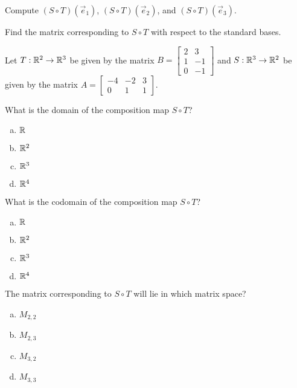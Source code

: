 \begin{applicationActivities}{1}{21}
\begin{activity}{0}
Compute $(S \circ T)(\vec{e}_1)$, $(S \circ T)(\vec{e}_2)$, and
$(S \circ T)(\vec{e}_3)$.
\end{activity}

\begin{activity}{0}
Find the matrix corresponding to $S \circ T$ with respect to the standard bases.
\end{activity}

\begin{activity}{0}
Let $T: \mathbb{R}^2 \rightarrow \mathbb{R}^3$ be given by the matrix $B=\begin{bmatrix} 2 & 3 \\ 1 & -1 \\ 0 & -1 \end{bmatrix}$ and $S: \mathbb{R}^3 \rightarrow \mathbb{R}^2$ be given by the matrix $A=\begin{bmatrix} -4 & -2 & 3 \\ 0 & 1 & 1 \end{bmatrix}$.

What is the domain of the composition map $S \circ T$?
\begin{enumerate}[(a)]
\item $\mathbb{R}$
\item $\mathbb{R}^2$
\item $\mathbb{R}^3$
\item $\mathbb{R}^4$
\end{enumerate}
\end{activity}

\begin{activity}{0}
What is the codomain of the composition map $S \circ T$?
\begin{enumerate}[(a)]
\item $\mathbb{R}$
\item $\mathbb{R}^2$
\item $\mathbb{R}^3$
\item $\mathbb{R}^4$
\end{enumerate}
\end{activity}

\begin{activity}{0}
The matrix corresponding to $S \circ T$ will lie in which matrix space?
\begin{enumerate}[(a)]
\item $M_{2,2}$
\item $M_{2,3}$
\item $M_{3,2}$
\item $M_{3,3}$
\end{enumerate}
\end{activity}


\end{applicationActivities}
